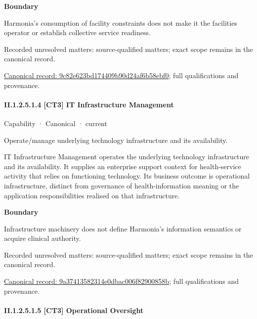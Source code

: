 \textbf{Boundary}



Harmonia's consumption of facility constraints does not make it the facilities operator or establish collective service readiness.


{\small Recorded unresolved matters: source-qualified matters; exact scope remains in the canonical record.}\par
{\footnotesize \href{../../../../continuum/strategy/capability/9c82e623bd174409b90d24af6b58ebf0.md}{Canonical record: 9c82e623bd174409b90d24af6b58ebf0}; full qualifications and provenance.}\par
\paragraph*{II.1.2.5.1.4 [CT3] IT Infrastructure Management}
\label{navigation:II.1.2.5.1.4}

\label{element:9a37413582314e0dbac006f82900858b}
{\small Capability · Canonical · current}\par

Operate/manage underlying technology infrastructure and its availability.



IT Infrastructure Management operates the underlying technology infrastructure and its availability. It supplies an enterprise support context for health-service activity that relies on functioning technology. Its business outcome is operational infrastructure, distinct from governance of health-information meaning or the application responsibilities realised on that infrastructure.



\textbf{Boundary}



Infrastructure machinery does not define Harmonia's information semantics or acquire clinical authority.


{\small Recorded unresolved matters: source-qualified matters; exact scope remains in the canonical record.}\par
{\footnotesize \href{../../../../continuum/strategy/capability/9a37413582314e0dbac006f82900858b.md}{Canonical record: 9a37413582314e0dbac006f82900858b}; full qualifications and provenance.}\par
\paragraph*{II.1.2.5.1.5 [CT3] Operational Oversight}
\label{navigation:II.1.2.5.1.5}

